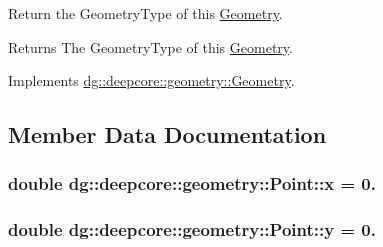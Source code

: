 Return the Geometry\+Type of this \hyperlink{structdg_1_1deepcore_1_1geometry_1_1_geometry}{Geometry}. 

\begin{DoxyReturn}{Returns}
The Geometry\+Type of this \hyperlink{structdg_1_1deepcore_1_1geometry_1_1_geometry}{Geometry}. 
\end{DoxyReturn}


Implements \hyperlink{group___geometry_module_gacdfc02ad835493ef40a398bdf24e30a1}{dg\+::deepcore\+::geometry\+::\+Geometry}.



\subsection{Member Data Documentation}
\subsubsection[{\texorpdfstring{x}{x}}]{\setlength{\rightskip}{0pt plus 5cm}double dg\+::deepcore\+::geometry\+::\+Point\+::x = 0.}\hypertarget{structdg_1_1deepcore_1_1geometry_1_1_point_aa279ff5fe5e1aa8c6f0a461a21791569}{}\label{structdg_1_1deepcore_1_1geometry_1_1_point_aa279ff5fe5e1aa8c6f0a461a21791569}
\subsubsection[{\texorpdfstring{y}{y}}]{\setlength{\rightskip}{0pt plus 5cm}double dg\+::deepcore\+::geometry\+::\+Point\+::y = 0.}\hypertarget{structdg_1_1deepcore_1_1geometry_1_1_point_a34ee2d8d66009ad7128a7ef4dd97d190}{}\label{structdg_1_1deepcore_1_1geometry_1_1_point_a34ee2d8d66009ad7128a7ef4dd97d190}
